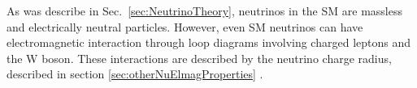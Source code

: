 


As was describe in Sec.~\ref{sec:NeutrinoTheory}, neutrinos in the \gls{SM} are massless and electrically neutral particles. However, even \gls{SM} neutrinos can have electromagnetic interaction through loop diagrams involving charged leptons and the W boson. These interactions are described by the neutrino charge radius, described in section \ref{sec:otherNuElmagProperties}  \cite{SnowmassNeutrinoFrontierReport.pdf}.


